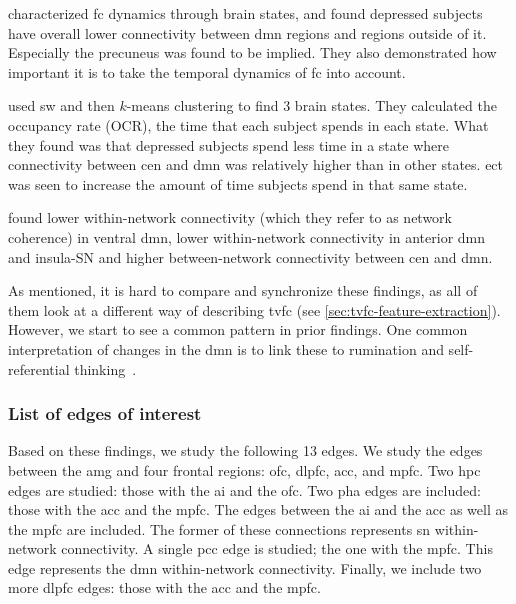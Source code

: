 \textcite{AlonsoMartinez2020} characterized \gls{fc} dynamics through brain states, and found depressed subjects have overall lower connectivity between \gls{dmn} regions and regions outside of it.
Especially the precuneus was found to be implied.
They also demonstrated how important it is to take the temporal dynamics of \gls{fc} into account.

\textcite{Dini2021} used \gls{sw} and then $k$-means clustering to find 3 brain states.
They calculated the occupancy rate (OCR), the time that each subject spends in each state.
What they found was that depressed subjects spend less time in a state where connectivity between \gls{cen} and \gls{dmn} was relatively higher than in other states.
\Gls{ect} was seen to increase the amount of time subjects spend in that same state.

\textcite{Ho2021} found lower within-network connectivity (which they refer to as network coherence) in ventral \gls{dmn}, lower within-network connectivity in anterior \gls{dmn} and insula-SN and higher between-network connectivity between \gls{cen} and \gls{dmn}.

As mentioned, it is hard to compare and synchronize these findings, as all of them look at a different way of describing \gls{tvfc} (see \cref{sec:tvfc-feature-extraction}).
However, we start to see a common pattern in prior findings.
One common interpretation of changes in the \gls{dmn} is to link these to rumination and self-referential thinking~\parencite{Zhou2020}.

\subsubsection{List of edges of interest}

Based on these findings, we study the following 13 edges.
We study the edges between the \gls{amg} and four frontal regions: \gls{ofc}, \gls{dlpfc}, \gls{acc}, and \gls{mpfc}.
Two \gls{hpc} edges are studied: those with the \gls{ai} and the \gls{ofc}.
Two \gls{pha} edges are included: those with the \gls{acc} and the \gls{mpfc}.
The edges between the \gls{ai} and the \gls{acc} as well as the \gls{mpfc} are included.
The former of these connections represents \gls{sn} within-network connectivity.
A single \gls{pcc} edge is studied; the one with the \gls{mpfc}.  %
This edge represents the \gls{dmn} within-network connectivity.
Finally, we include two more \gls{dlpfc} edges: those with the \gls{acc} and the \gls{mpfc}. %


